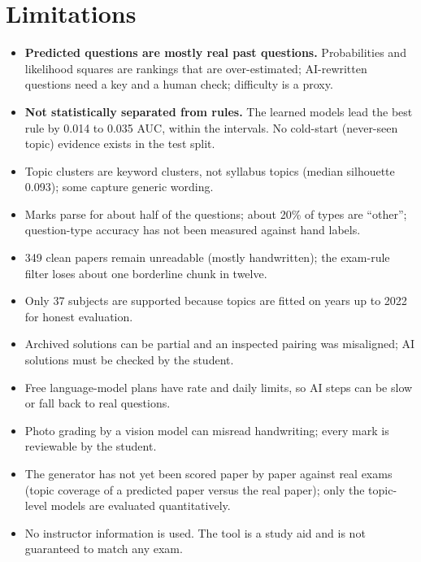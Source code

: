 \documentclass[11pt,a4paper]{article}
\begin{document}
\section{Limitations}
\label{sec:limits}
\begin{itemize}
\item \textbf{Predicted questions are mostly real past questions.} Probabilities and likelihood squares are rankings that are
over-estimated; AI-rewritten questions need a key and a human check; difficulty is a proxy.
\item \textbf{Not statistically separated from rules.} The learned models lead the best rule by 0.014 to 0.035 AUC, within
the intervals. No cold-start (never-seen topic) evidence exists in the test split.
\item Topic clusters are keyword clusters, not syllabus topics (median silhouette 0.093); some capture generic wording.
\item Marks parse for about half of the questions; about 20\% of types are ``other''; question-type accuracy has not been
measured against hand labels.
\item 349 clean papers remain unreadable (mostly handwritten); the exam-rule filter loses about one borderline chunk in twelve.
\item Only 37 subjects are supported because topics are fitted on years up to 2022 for honest evaluation.
\item Archived solutions can be partial and an inspected pairing was misaligned; AI solutions must be checked by the student.
\item Free language-model plans have rate and daily limits, so AI steps can be slow or fall back to real questions.
\item Photo grading by a vision model can misread handwriting; every mark is reviewable by the student.
\item The generator has not yet been scored paper by paper against real exams (topic coverage of a predicted paper versus the
real paper); only the topic-level models are evaluated quantitatively.
\item No instructor information is used. The tool is a study aid and is not guaranteed to match any exam.
\end{itemize}

\end{document}
